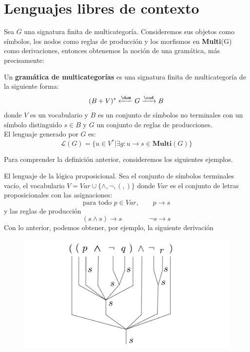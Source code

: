 \documentclass[../main.tex]{subfiles}
\begin{document}
		

		



\section{Lenguajes libres de contexto}

Sea $G$ una signatura finita de multicategoría. Consideremos sus objetos como símbolos, los nodos como reglas de producción y los morfismos en \textbf{Multi}(G) como derivaciones, entonces obtenemos la noción de una gramática, más precisamente:

\begin{dfn}
	Un \textbf{gramática de multicategorías} es una signatura finita de multicategoría de la siguiente forma: 
	\[
		(B+V)^* \xleftarrow{\dom} G \xrightarrow[]{\cod} B
	\]
	donde $V$ es un vocabulario y $B$ es un conjunto de símbolos no terminales con un símbolo distinguido $s \in B$ y $G$ un conjunto de reglas de producciones. \\ El lenguaje generado por $G$ es: 
	\[
		\mathcal{L}(G) = \{ u \in V^*|\exists g: u \to s \in \textbf{Multi}(G) \}
	\]
\end{dfn}
Para comprender la definición anterior, consideremos los siguientes ejemplos. 

\begin{ej}
	El lenguaje de la lógica proposicional. Sea el conjunto de símbolos terminales vacío, el vocabulario $V=Var \cup \{ \wedge, \neg, (, ) \}$ donde $Var$ es el conjunto de letras proposicionales con las asignaciones:
	$$\text{para todo }p \in Var, \qquad p \to s$$
	y las reglas de producción 
	$$(s \wedge s) \to s \qquad \qquad \neg s \to s$$
	Con lo anterior, podemos obtener, por ejemplo, la siguiente derivación
	\begin{figure}[H]
		\includegraphics[scale=0.2]{diagrama/derivacion1.pdf}
		\centering
	\end{figure}
\end{ej}
\end{document}
